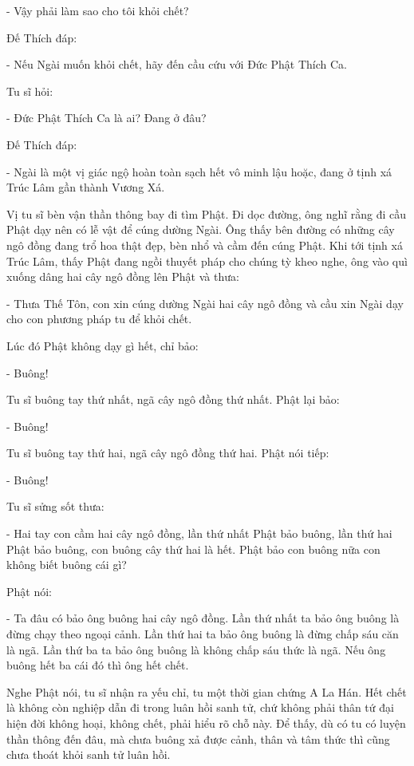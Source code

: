 \documentclass[
  12pt,
  oneside]{book}
\begin{document}
- Vậy phải làm sao cho tôi khỏi chết?

Đế Thích đáp:

- Nếu Ngài muốn khỏi chết, hãy đến cầu cứu với Đức Phật Thích Ca.

Tu sĩ hỏi:

- Đức Phật Thích Ca là ai? Đang ở đâu?

Đế Thích đáp:

- Ngài là một vị giác ngộ hoàn toàn sạch hết vô minh lậu hoặc, đang ở tịnh xá Trúc Lâm gần thành Vương Xá.

Vị tu sĩ bèn vận thần thông bay đi tìm Phật. Đi dọc đường, ông nghĩ rằng đi cầu Phật dạy nên có lễ vật để cúng dường Ngài. Ông thấy bên đường có những cây ngô đồng đang trổ hoa thật đẹp, bèn nhổ và cầm đến cúng Phật. Khi tới tịnh xá Trúc Lâm, thấy Phật đang ngồi thuyết pháp cho chúng tỳ kheo nghe, ông vào quì xuống dâng hai cây ngô đồng lên Phật và thưa:

- Thưa Thế Tôn, con xin cúng dường Ngài hai cây ngô đồng và cầu xin Ngài dạy cho con phương pháp tu để khỏi chết.

Lúc đó Phật không dạy gì hết, chỉ bảo:

- Buông!

Tu sĩ buông tay thứ nhất, ngã cây ngô đồng thứ nhất. Phật lại bảo:

- Buông!

Tu sĩ buông tay thứ hai, ngã cây ngô đồng thứ hai. Phật nói tiếp:

- Buông!

Tu sĩ sửng sốt thưa:

- Hai tay con cầm hai cây ngô đồng, lần thứ nhất Phật bảo buông, lần thứ hai Phật bảo buông, con buông cây thứ hai là hết. Phật bảo con buông nữa con không biết buông cái gì?

Phật nói:

- Ta đâu có bảo ông buông hai cây ngô đồng. Lần thứ nhất ta bảo ông buông là đừng chạy theo ngoại cảnh. Lần thứ hai ta bảo ông buông là đừng chấp sáu căn là ngã. Lần thứ ba ta bảo ông buông là không chấp sáu thức là ngã. Nếu ông buông hết ba cái đó thì ông hết chết.

Nghe Phật nói, tu sĩ nhận ra yếu chỉ, tu một thời gian chứng A La Hán. Hết chết là không còn nghiệp dẫn đi trong luân hồi sanh tử, chứ không phải thân tứ đại hiện đời không hoại, không chết, phải hiểu rõ chỗ này. Để thấy, dù có tu có luyện thần thông đến đâu, mà chưa buông xả được cảnh, thân và tâm thức thì cũng chưa thoát khỏi sanh tử luân hồi.
\end{document}
